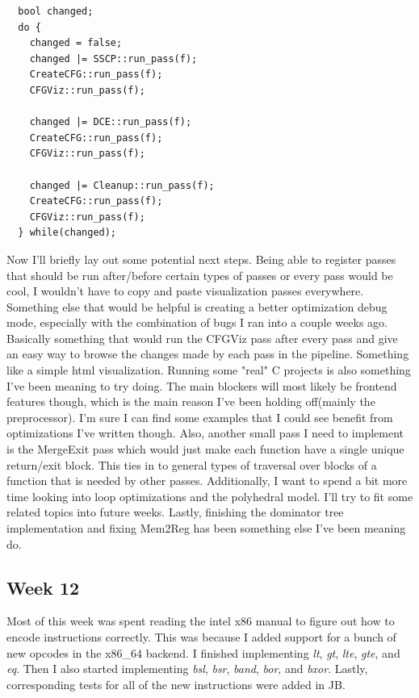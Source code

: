 \documentclass[11pt, a4paper, titlepage]{article}
\begin{document}
\begin{lstlisting}
  bool changed;
  do {
    changed = false;
    changed |= SSCP::run_pass(f);
    CreateCFG::run_pass(f);
    CFGViz::run_pass(f);
  
    changed |= DCE::run_pass(f);
    CreateCFG::run_pass(f);
    CFGViz::run_pass(f);
  
    changed |= Cleanup::run_pass(f);
    CreateCFG::run_pass(f);
    CFGViz::run_pass(f);
  } while(changed);
\end{lstlisting}

Now I'll briefly lay out some potential next steps. Being able to register passes that should be run after/before certain types of passes or every pass would be cool, I wouldn't have to copy and paste visualization passes everywhere. Something else that would be helpful is creating a better optimization debug mode, especially with the combination of bugs I ran into a couple weeks ago. Basically something that would run the CFGViz pass after every pass and give an easy way to browse the changes made by each pass in the pipeline. Something like a simple html visualization. Running some "real" C projects is also something I've been meaning to try doing. The main blockers will most likely be frontend features though, which is the main reason I've been holding off(mainly the preprocessor). I'm sure I can find some examples that I could see benefit from optimizations I've written though. Also, another small pass I need to implement is the MergeExit pass which would just make each function have a single unique return/exit block. This ties in to general types of traversal over blocks of a function that is needed by other passes. Additionally, I want to spend a bit more time looking into loop optimizations and the polyhedral model. I'll try to fit some related topics into future weeks. Lastly, finishing the dominator tree implementation and fixing Mem2Reg has been something else I've been meaning do.

\subsection{Week 12}

Most of this week was spent reading the intel x86 manual to figure out how to encode instructions correctly.
This was because I added support for a bunch of new opcodes in the x86\_64 backend.
I finished implementing \textit{lt}, \textit{gt}, \textit{lte}, \textit{gte}, and \textit{eq}.
Then I also started implementing \textit{bsl}, \textit{bsr}, \textit{band}, \textit{bor}, and \textit{bxor}. Lastly, corresponding tests for all of the new instructions were added in JB.
\end{document}
